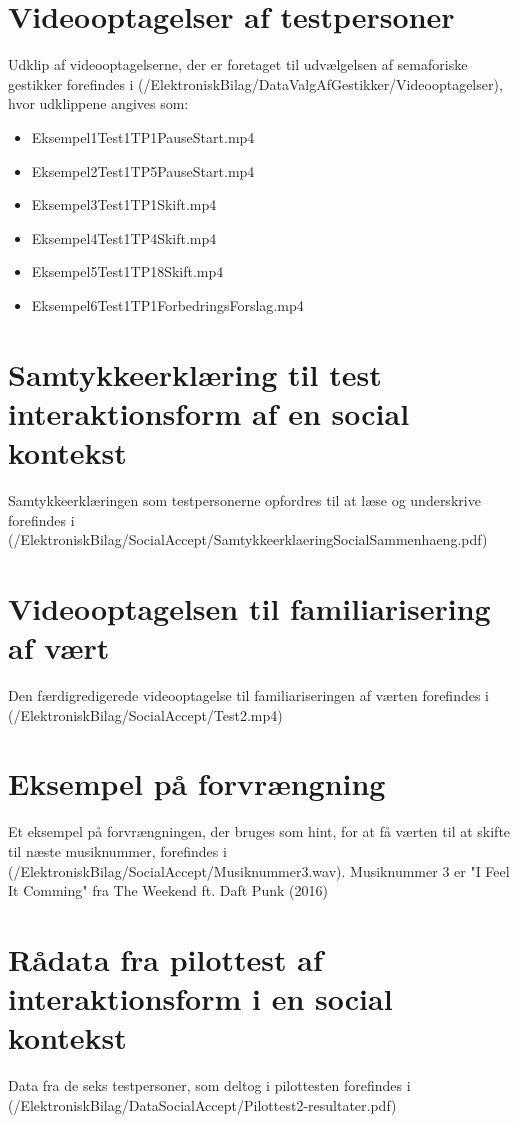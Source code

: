 \section{Videooptagelser af testpersoner}
\label{app:VideooptagelseValgAfGestikkerTestpersoner}
%
Udklip af videooptagelserne, der er foretaget til udvælgelsen af semaforiske gestikker forefindes i (/ElektroniskBilag/DataValgAfGestikker/Videooptagelser), hvor udklippene angives som: \blankline
%
\begin{itemize}
  \item Eksempel1Test1TP1PauseStart.mp4
  \item Eksempel2Test1TP5PauseStart.mp4 
  \item Eksempel3Test1TP1Skift.mp4 
  \item Eksempel4Test1TP4Skift.mp4
  \item Eksempel5Test1TP18Skift.mp4 
  \item Eksempel6Test1TP1ForbedringsForslag.mp4
\end{itemize}

%
\section{Samtykkeerklæring til test interaktionsform af en social kontekst}
\label{app:SamtykkeerklaeringSocialAccept}
%
Samtykkeerklæringen som testpersonerne opfordres til at læse og underskrive forefindes i (/ElektroniskBilag/SocialAccept/SamtykkeerklaeringSocialSammenhaeng.pdf)
%
\section{Videooptagelsen til familiarisering af vært}
\label{app:VideooptagelseFam}
%
Den færdigredigerede videooptagelse til familiariseringen af værten forefindes i (/ElektroniskBilag/SocialAccept/Test2.mp4)
%
\section{Eksempel på forvrængning}
\label{app:ForvraengningHint}
%
Et eksempel på forvrængningen, der bruges som hint, for at få værten til at skifte til næste musiknummer, forefindes i (/ElektroniskBilag/SocialAccept/Musiknummer3.wav). Musiknummer 3 er "I Feel It Comming" fra The Weekend ft. Daft Punk (2016)
%
\section{Rådata fra pilottest af interaktionsform i en social kontekst}
\label{app:ResultaterPilottestSocialAccept}
%
Data fra de seks testpersoner, som deltog i pilottesten forefindes i \\
(/ElektroniskBilag/DataSocialAccept/Pilottest2-resultater.pdf)
%
